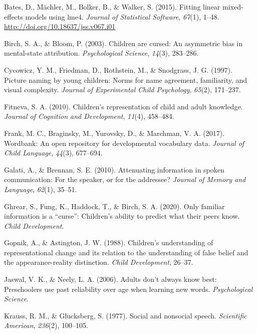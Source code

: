 \documentclass[10pt, letterpaper]{article}
\begin{document}
\leavevmode\hypertarget{ref-bates2015}{}%
Bates, D., Mächler, M., Bolker, B., \& Walker, S. (2015). Fitting linear
mixed-effects models using lme4. \emph{Journal of Statistical Software},
\emph{67}(1), 1--48. \url{http://doi.org/10.18637/jss.v067.i01}

\leavevmode\hypertarget{ref-birch2003}{}%
Birch, S. A., \& Bloom, P. (2003). Children are cursed: An asymmetric
bias in mental-state attribution. \emph{Psychological Science},
\emph{14}(3), 283--286.

\leavevmode\hypertarget{ref-cycowicz1997}{}%
Cycowicz, Y. M., Friedman, D., Rothstein, M., \& Snodgrass, J. G.
(1997). Picture naming by young children: Norms for name agreement,
familiarity, and visual complexity. \emph{Journal of Experimental Child
Psychology}, \emph{65}(2), 171--237.

\leavevmode\hypertarget{ref-fitneva2010}{}%
Fitneva, S. A. (2010). Children's representation of child and adult
knowledge. \emph{Journal of Cognition and Development}, \emph{11}(4),
458--484.

\leavevmode\hypertarget{ref-frank2017}{}%
Frank, M. C., Braginsky, M., Yurovsky, D., \& Marchman, V. A. (2017).
Wordbank: An open repository for developmental vocabulary data.
\emph{Journal of Child Language}, \emph{44}(3), 677--694.

\leavevmode\hypertarget{ref-galati2010}{}%
Galati, A., \& Brennan, S. E. (2010). Attenuating information in spoken
communication: For the speaker, or for the addressee? \emph{Journal of
Memory and Language}, \emph{62}(1), 35--51.

\leavevmode\hypertarget{ref-ghrear2020}{}%
Ghrear, S., Fung, K., Haddock, T., \& Birch, S. A. (2020). Only familiar
information is a ``curse'': Children's ability to predict what their
peers know. \emph{Child Development}.

\leavevmode\hypertarget{ref-gopnik1988}{}%
Gopnik, A., \& Astington, J. W. (1988). Children's understanding of
representational change and its relation to the understanding of false
belief and the appearance-reality distinction. \emph{Child Development},
26--37.

\leavevmode\hypertarget{ref-jaswal2006}{}%
Jaswal, V. K., \& Neely, L. A. (2006). Adults don't always know best:
Preschoolers use past reliability over age when learning new words.
\emph{Psychological Science}.

\leavevmode\hypertarget{ref-krauss1977}{}%
Krauss, R. M., \& Glucksberg, S. (1977). Social and nonsocial speech.
\emph{Scientific American}, \emph{236}(2), 100--105.
\end{document}
